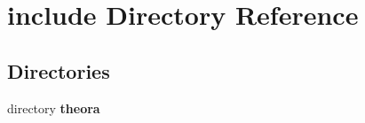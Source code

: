 \section{include Directory Reference}
\label{dir_a1fe1b2cf9055168abcdf67f8f42c5e8}
\subsection*{Directories}
\begin{DoxyCompactItemize}
\item 
directory {\bf theora}
\end{DoxyCompactItemize}
